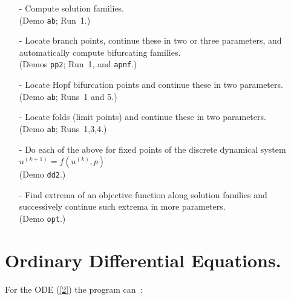 \documentclass[12pt]{report}
\begin{document}
\begin{itemize}
\item[-]
  Compute solution families.\\  (Demo {\tt ab}; Run~1.) 
\item[-]
  Locate branch points, continue these in two or three parameters,
  and automatically compute
  bifurcating families. \\ (Demos {\tt pp2}; Run~1, and {\tt apnf}.)
\item[-]
  Locate Hopf bifurcation points and continue these in two
  parameters. \\ (Demo {\tt ab}; Runs~1 and 5.)
\item[-]
  Locate folds (limit points) and continue these 
  in two parameters. \\(Demo {\tt ab}; Runs~1,3,4.)
\item[-]
  Do each of the above for fixed points
  of the discrete dynamical system 
  $u^{(k+1)}= f( u^{(k)}, p )$ \\ (Demo {\tt dd2}.)
\item[-]
  Find extrema of an objective function along solution families
  and successively continue such extrema in more parameters.
  \\ (Demo {\tt opt}.)
\end{itemize}


\section{ Ordinary Differential Equations.} \label{sec:ODEs}
For the ODE (\ref{2}) the program can~:~
 
\end{document}
